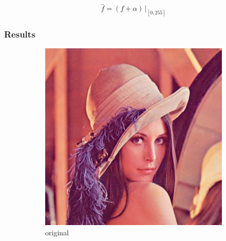 \documentclass[12pt]{article}
\theoremstyle{definition}
\newcommand{\subfiguresize}{.3\textwidth}
\begin{document}
\begin{equation}
    \hat{f} = (f + \alpha) \, \Big|_{[0,255]}
\end{equation}

\subsubsection{Results}

\begin{figure}[H]\centering
    \begin{subfigure}[t]{\subfiguresize}\centering
        \includegraphics[width=\textwidth]{lenac.png}
        \caption{original}
    \end{subfigure}
    \hspace{.05\textwidth}
    \begin{subfigure}[t]{\subfiguresize}\centering

\end{subfigure}
\end{figure}
\end{document}
